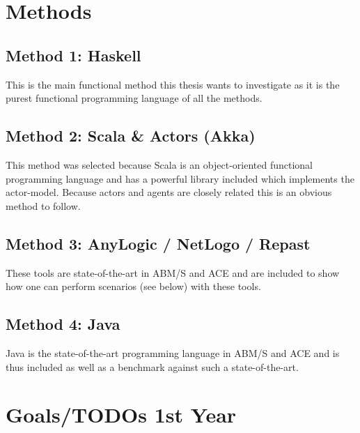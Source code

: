 \documentclass{article}
\begin{document}

\section{Methods}
\subsection{Method 1: Haskell}
This is the main functional method this thesis wants to investigate as it is the purest functional programming language of all the methods.

\subsection{Method 2: Scala \& Actors (Akka)}
This method was selected because Scala is an object-oriented functional programming language and has a powerful library included which implements the actor-model. Because actors and agents are closely related this is an obvious method to follow.

\subsection{Method 3: AnyLogic / NetLogo / Repast}
These tools are state-of-the-art in ABM/S and ACE and are included to show how one can perform scenarios (see below) with these tools.

\subsection{Method 4: Java}
Java is the state-of-the-art programming language in ABM/S and ACE and is thus included as well as a benchmark against such a state-of-the-art.


\pagebreak

\section{Goals/TODOs 1st Year}
\end{document}
